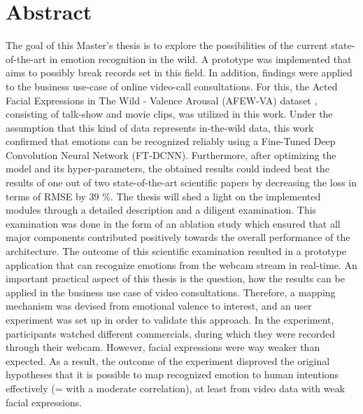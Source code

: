 \documentclass[11pt,a4paper]{scrbook}
\begin{document}
\begin{titlepage}
\end{titlepage}

\restoregeometry



\chapter{Abstract}
The goal of this Master's thesis is to explore the possibilities of the current state-of-the-art in emotion recognition in the wild. A prototype was implemented that aims to possibly break records set in this field. In addition, findings were applied to the business use-case of online video-call consultations.
\newline\newline
For this, the Acted Facial Expressions in The Wild - Valence Arousal (AFEW-VA) dataset \citep{Kossaifi:2017:AFEW-VADatabase}, consisting of talk-show and movie clips, was utilized in this work. Under the assumption that this kind of data represents in-the-wild data, this work confirmed that emotions can be recognized reliably using a Fine-Tuned Deep Convolution Neural Network (FT-DCNN). Furthermore, after optimizing the model and its hyper-parameters, the obtained results could indeed beat the results of one out of two state-of-the-art scientific papers by decreasing the loss in terms of RMSE by 39 \%.
\newline\newline
The thesis will shed a light on the implemented modules through a detailed description and a diligent examination. This examination was done in the form of an ablation study which ensured that all major components contributed positively towards the overall performance of the architecture. The outcome of this scientific examination resulted in a prototype application that can recognize emotions from the webcam stream in real-time.
\newline\newline
An important practical aspect of this thesis is the question, how the results can be applied in the business use case of video consultations. Therefore, a mapping mechanism was devised from emotional valence to interest, and an user experiment was set up in order to validate this approach. In the experiment, participants watched different commercials, during which they were recorded through their webcam. However, facial expressions were way weaker than expected. As a result, the outcome of the experiment disproved the original hypotheses that it is possible to map recognized emotion to human intentions effectively (= with a moderate correlation), at least from video data with weak facial expressions.
\end{document}
